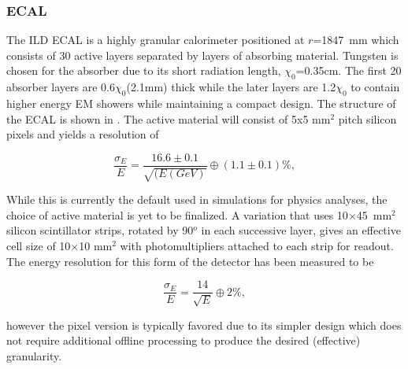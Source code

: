 \subsubsection{ECAL}
The \ac{ILD} \ac{ECAL} is a highly granular calorimeter positioned at $r$=1847~mm which consists of 30 active layers separated by layers of absorbing material. Tungsten is chosen for the absorber due to its short radiation length, $\chi_0$=0.35cm. The first 20 absorber layers are 0.6$\chi_0$(2.1mm) thick while the later layers are  1.2$\chi_0$ to contain higher energy \ac{EM} showers while maintaining a compact design. The structure of the \ac{ECAL} is shown in . The active material will consist of 5x5 mm$^2$ pitch silicon pixels and yields a resolution of

\begin{equation}
  \frac{\sigma_E}{E}=\frac{16.6\pm 0.1}{\sqrt{(E(GeV)}}\oplus(1.1\pm 0.1)\%,
\end{equation}

While this is currently the default used in simulations for physics analyses, the choice of active material is yet to be finalized. A variation that uses 10$\times$45~mm$^2$ silicon scintillator strips, rotated by 90${^o}$ in each successive layer, gives an effective cell size of 10$\times$10 mm$^2$ with photomultipliers attached to each strip for readout. The energy resolution for this form of the detector has been measured to be \cite{ILCTDR}

\begin{equation}
  \frac{\sigma_E}{E}=\frac{14}{\sqrt{E}}\oplus2\%,
\end{equation}

however the pixel version is typically favored due to its simpler design which does not require additional offline processing to produce the desired (effective) granularity.

